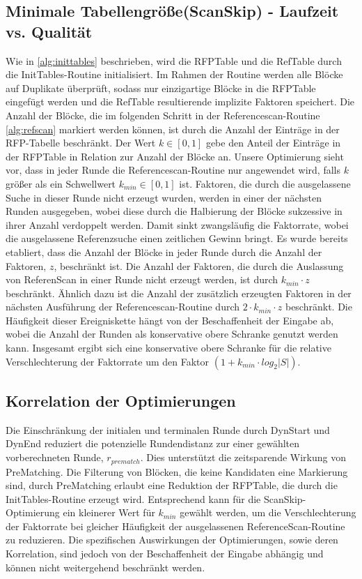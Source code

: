 \subsection{Minimale Tabellengröße(ScanSkip) - Laufzeit vs. Qualität}
Wie in \ref{alg:inittables} beschrieben, wird die RFPTable und die RefTable durch die InitTables-Routine initialisiert. Im Rahmen der Routine werden alle Blöcke auf Duplikate
überprüft, sodass nur einzigartige Blöcke in die RFPTable eingefügt werden und die RefTable resultierende implizite Faktoren speichert. Die Anzahl der Blöcke, die im folgenden Schritt 
in der Referencescan-Routine \ref{alg:refscan} markiert werden können, ist durch die Anzahl der Einträge in der RFP-Tabelle beschränkt. Der Wert $k\in [0,1]$ gebe den Anteil der
Einträge in der RFPTable in Relation zur Anzahl der Blöcke an. Unsere Optimierung sieht vor, dass in jeder Runde die Referencescan-Routine nur angewendet wird, falls $k$ größer
als ein Schwellwert $k_{min}\in [0,1]$ ist. Faktoren, die durch die ausgelassene Suche in dieser Runde nicht erzeugt wurden, werden in einer der nächsten Runden ausgegeben, wobei diese
durch die Halbierung der Blöcke sukzessive in ihrer Anzahl verdoppelt werden. Damit sinkt zwangsläufig die Faktorrate, wobei die ausgelassene Referenzsuche einen zeitlichen Gewinn bringt.
Es wurde bereits etabliert, dass die Anzahl der Blöcke in jeder Runde durch die Anzahl der Faktoren, $z$, beschränkt ist. Die Anzahl der Faktoren, die durch die Auslassung von 
ReferenScan in einer Runde nicht erzeugt werden, ist durch $k_{min} \cdot z$ beschränkt. Ähnlich dazu ist die Anzahl der zusätzlich erzeugten Faktoren in der nächsten Ausführung
der Referencescan-Routine durch $2 \cdot k_{min} \cdot z$ beschränkt. Die Häufigkeit dieser Ereigniskette hängt von der Beschaffenheit der Eingabe ab, wobei die Anzahl der
Runden als konservative obere Schranke genutzt werden kann. Insgesamt ergibt sich eine konservative obere Schranke für die relative Verschlechterung der Faktorrate um den Faktor 
$(1 + k_{min} \cdot {log_2{|S|}})$.

\subsection{Korrelation der Optimierungen}
Die Einschränkung der initialen und terminalen Runde durch DynStart und DynEnd reduziert die potenzielle Rundendistanz zur einer gewählten vorberechneten Runde, $r_{prematch}$.
Dies unterstützt die zeitsparende Wirkung von PreMatching. Die Filterung von Blöcken, die keine Kandidaten eine Markierung sind, durch PreMatching erlaubt eine Reduktion der 
RFPTable, die durch die InitTables-Routine erzeugt wird. Entsprechend kann für die ScanSkip-Optimierung ein kleinerer Wert für $k_{min}$ gewählt werden, um die Verschlechterung
der Faktorrate bei gleicher Häufigkeit der ausgelassenen ReferenceScan-Routine zu reduzieren. Die spezifischen Auswirkungen der Optimierungen, sowie deren Korrelation, sind 
jedoch von der Beschaffenheit der Eingabe abhängig und können nicht weitergehend beschränkt werden.